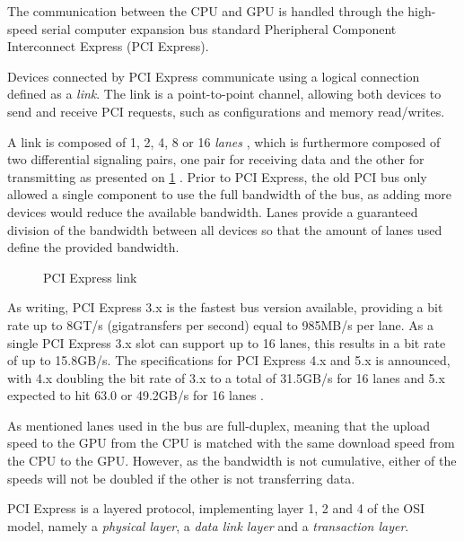The communication between the CPU and GPU is handled through the high-speed serial computer expansion bus standard Pheripheral Component Interconnect Express (PCI Express).

Devices connected by PCI Express communicate using a logical connection defined as a \textit{link}.
The link is a point-to-point channel, allowing both devices to send and receive PCI requests, such as configurations and memory read/writes.

A link is composed of 1, 2, 4, 8 or 16 \textit{lanes} \cite{wiki:pci}, which is furthermore composed of two differential signaling pairs, one pair for receiving data and the other for transmitting as presented on \cref{fig:hw-pci-express} .
Prior to PCI Express, the old PCI bus only allowed a single component to use the full bandwidth of the bus, as adding more devices would reduce the available bandwidth.
Lanes provide a guaranteed division of the bandwidth between all devices so that the amount of lanes used define the provided bandwidth.

\begin{figure}[ht]
	\centering
	\caption{PCI Express link}
	\label{fig:hw-pci-express}
\end{figure}



As writing, PCI Express 3.x is the fastest bus version available, providing a bit rate up to 8GT/s (gigatransfers per second) equal to 985MB/s per lane.
As a single PCI Express 3.x slot can support up to 16 lanes, this results in a bit rate of up to 15.8GB/s.
The specifications for PCI Express 4.x and 5.x is announced, with 4.x doubling the bit rate of 3.x to a total of 31.5GB/s for 16 lanes and 5.x expected to hit 63.0 or 49.2GB/s for 16 lanes \cite{wiki:pci}.

As mentioned lanes used in the bus are full-duplex, meaning that the upload speed to the GPU from the CPU is matched with the same download speed from the CPU to the GPU.
However, as the bandwidth is not cumulative, either of the speeds will not be doubled if the other is not transferring data.

PCI Express is a layered protocol, implementing layer 1, 2 and 4 of the OSI model, namely a \textit{physical layer},  a \textit{data link layer} and a \textit{transaction layer}.
